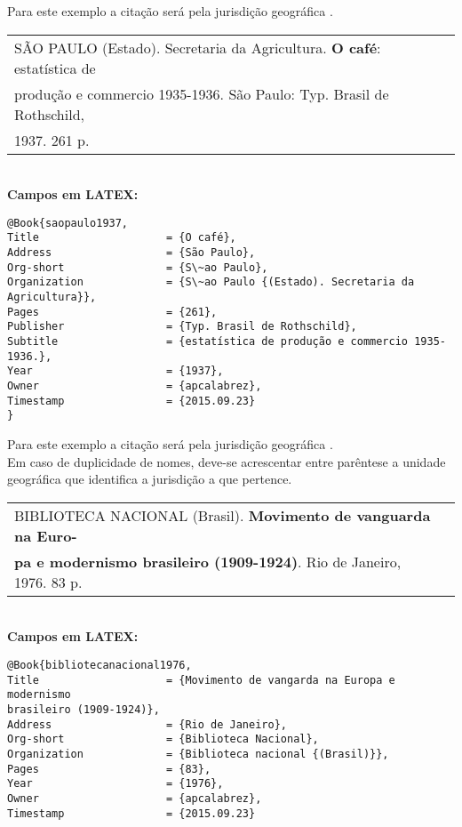 Para este exemplo a citação será pela jurisdição geográfica \cite{brasil1990}. \\

\begin{tabular}{|l|c|} \hline
SÃO PAULO (Estado). Secretaria da Agricultura. \textbf{O café}: estatística de \\produção e commercio 1935-1936. São Paulo: Typ. Brasil de Rothschild, \\1937. 261 p.  \\\hline
\end{tabular}\\

\textbf{Campos em LATEX:}

\begin{verbatim}
@Book{saopaulo1937,
Title                    = {O café},
Address                  = {São Paulo},
Org-short                = {S\~ao Paulo},
Organization             = {S\~ao Paulo {(Estado). Secretaria da 
Agricultura}},
Pages                    = {261},
Publisher                = {Typ. Brasil de Rothschild},
Subtitle                 = {estatística de produção e commercio 1935-
1936.},
Year                     = {1937},
Owner                    = {apcalabrez},
Timestamp                = {2015.09.23}
}
\end{verbatim}

Para este exemplo a citação será pela jurisdição geográfica \cite{saopaulo1937}. \\

Em caso de duplicidade de nomes, deve-se acrescentar entre parêntese a unidade geográfica que identifica a jurisdição a que pertence. \\

\begin{tabular}{|l|c|} \hline
BIBLIOTECA NACIONAL (Brasil). \textbf{Movimento de vanguarda na Euro-} \\ \textbf{pa e modernismo brasileiro (1909-1924)}. Rio de Janeiro, 1976.	83 p.   \\\hline
\end{tabular}\\

\textbf{Campos em LATEX:}

\begin{verbatim}
@Book{bibliotecanacional1976,
Title                    = {Movimento de vangarda na Europa e modernismo
brasileiro (1909-1924)},
Address                  = {Rio de Janeiro},
Org-short                = {Biblioteca Nacional},
Organization             = {Biblioteca nacional {(Brasil)}},
Pages                    = {83},
Year                     = {1976},
Owner                    = {apcalabrez},
Timestamp                = {2015.09.23}
\end{verbatim}

